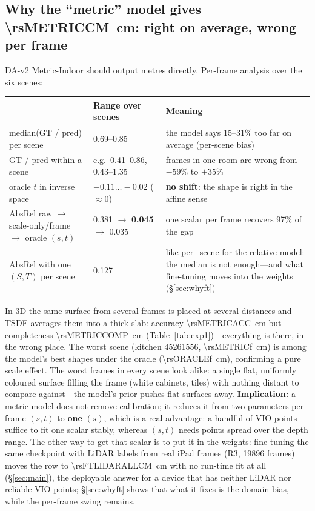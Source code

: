 \subsection{Why the ``metric'' model gives \SI{\rsMETRICCM}{cm}: right on average, wrong per frame}\label{sec:metric}
DA-v2 Metric-Indoor should output metres directly. Per-frame analysis over the six scenes:
\begin{table}[t]
\centering\small
\begin{tabularx}{\textwidth}{@{}lXX@{}}
\toprule
 & Range over scenes & Meaning \\
\midrule
median(GT / pred) per scene & 0.69--0.85 & the model says 15--31\% too far on average (per-scene bias) \\
GT / pred within a scene & e.g.\ 0.41--0.86, 0.43--1.35 & frames in one room are wrong from $-59\%$ to $+35\%$ \\
oracle $t$ in inverse space & $-0.11 \ldots -0.02$ ($\approx 0$) & \textbf{no shift}: the shape is right in the affine sense \\
AbsRel raw $\rightarrow$ scale-only/frame $\rightarrow$ oracle $(s,t)$ & 0.381 $\rightarrow$ \textbf{0.045} $\rightarrow$ 0.035 & one scalar per frame recovers 97\% of the gap \\
AbsRel with one $(S,T)$ per scene & 0.127 & like per\_scene for the relative model: the median is not enough---and what fine-tuning moves into the weights (\S\ref{sec:whyft}) \\
\bottomrule
\end{tabularx}
\end{table}
In 3D the same surface from several frames is placed at several distances and TSDF averages them into a thick slab:
accuracy \SI{\rsMETRICACC}{cm} but completeness \SI{\rsMETRICCOMP}{cm} (Table~\ref{tab:exp1})---everything is there,
in the wrong place. The worst scene (kitchen 45261556, \SI{\rsMETRICf}{cm}) is among the model's best shapes under the
oracle (\SI{\rsORACLEf}{cm}), confirming a pure scale effect. The worst frames in every scene look alike: a single flat, uniformly coloured surface
filling the frame (white cabinets, tiles) with nothing distant to compare against---the model's prior pushes flat
surfaces away. \textbf{Implication:} a metric model does not remove calibration; it reduces it from two parameters per
frame $(s,t)$ to \textbf{one} $(s)$, which is a real advantage: a handful of VIO points suffice to fit one scalar
stably, whereas $(s,t)$ needs points spread over the depth range. The other way to get that scalar is to put it in
the weights: fine-tuning the same checkpoint with LiDAR labels from real iPad frames (R3, \num{19896} frames) moves the
row to \SI{\rsFTLIDARALLCM}{cm} with no run-time fit at all (\S\ref{sec:main}), the deployable answer for a device that
has neither LiDAR nor reliable VIO points; \S\ref{sec:whyft} shows that what it fixes is the domain bias, while the
per-frame swing remains.

